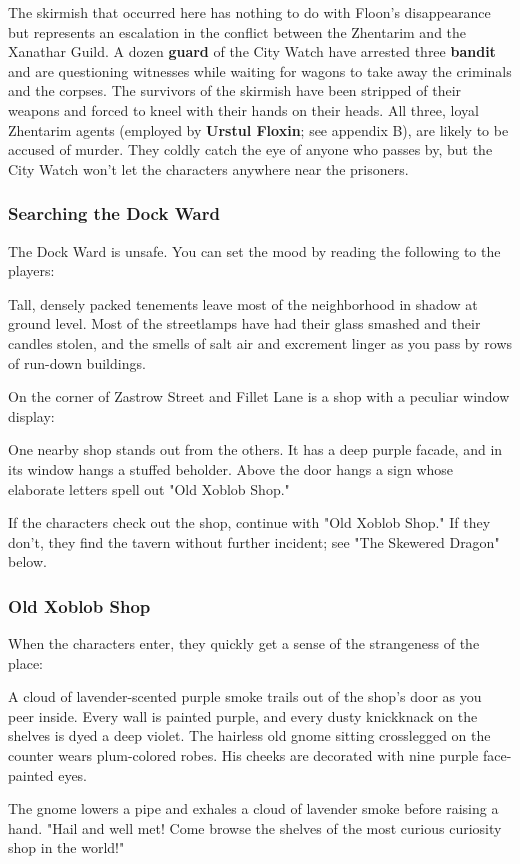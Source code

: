 \documentclass[10pt,a4paper,twoside,twocolumn,openany,nodeprecatedcode]{dndbook}
\begin{document}
The skirmish that occurred here has nothing to do with Floon's disappearance but represents an escalation in the conflict between the Zhentarim and the Xanathar Guild. A dozen \textbf{guard} of the City Watch have arrested three \textbf{bandit} and are questioning witnesses while waiting for wagons to take away the criminals and the corpses. The survivors of the skirmish have been stripped of their weapons and forced to kneel with their hands on their heads. All three, loyal Zhentarim agents (employed by \textbf{Urstul Floxin}; see appendix B), are likely to be accused of murder. They coldly catch the eye of anyone who passes by, but the City Watch won't let the characters anywhere near the prisoners.
\subsubsection{Searching the Dock Ward}
The Dock Ward is unsafe. You can set the mood by reading the following to the players:
\begin{DndReadAloud}{}
Tall, densely packed tenements leave most of the neighborhood in shadow at ground level. Most of the streetlamps have had their glass smashed and their candles stolen, and the smells of salt air and excrement linger as you pass by rows of run-down buildings.
\end{DndReadAloud}

On the corner of Zastrow Street and Fillet Lane is a shop with a peculiar window display:
\begin{DndReadAloud}{}
One nearby shop stands out from the others. It has a deep purple facade, and in its window hangs a stuffed beholder. Above the door hangs a sign whose elaborate letters spell out "Old Xoblob Shop."
\end{DndReadAloud}

If the characters check out the shop, continue with "Old Xoblob Shop." If they don't, they find the tavern without further incident; see "The Skewered Dragon" below.
\subsubsection{Old Xoblob Shop}
When the characters enter, they quickly get a sense of the strangeness of the place:
\begin{DndReadAloud}{}
A cloud of lavender-scented purple smoke trails out of the shop's door as you peer inside. Every wall is painted purple, and every dusty knickknack on the shelves is dyed a deep violet. The hairless old gnome sitting crosslegged on the counter wears plum-colored robes. His cheeks are decorated with nine purple face-painted eyes.

The gnome lowers a pipe and exhales a cloud of lavender smoke before raising a hand. "Hail and well met! Come browse the shelves of the most curious curiosity shop in the world!"
\end{DndReadAloud}
\end{document}
